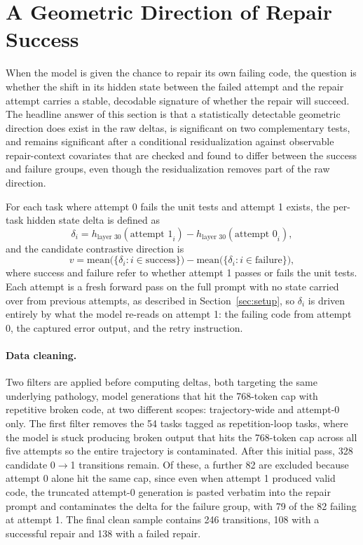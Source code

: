 \section{A Geometric Direction of Repair Success}
\label{sec:repair_geometry}

When the model is given the chance to repair its own failing code, the question is whether the shift in its hidden state between the failed attempt and the repair attempt carries a stable, decodable signature of whether the repair will succeed. The headline answer of this section is that a statistically detectable geometric direction does exist in the raw deltas, is significant on two complementary tests, and remains significant after a conditional residualization against observable repair-context covariates that are checked and found to differ between the success and failure groups, even though the residualization removes part of the raw direction.

For each task where attempt 0 fails the unit tests and attempt 1 exists, the per-task hidden state delta is defined as
\[
    \delta_i = h_{\text{layer 30}}(\text{attempt 1}_i) - h_{\text{layer 30}}(\text{attempt 0}_i),
\]
and the candidate contrastive direction is
\[
    v = \mathrm{mean}\bigl(\{\delta_i : i \in \text{success}\}\bigr) - \mathrm{mean}\bigl(\{\delta_i : i \in \text{failure}\}\bigr),
\]
where success and failure refer to whether attempt 1 passes or fails the unit tests. Each attempt is a fresh forward pass on the full prompt with no state carried over from previous attempts, as described in Section~\ref{sec:setup}, so $\delta_i$ is driven entirely by what the model re-reads on attempt 1: the failing code from attempt 0, the captured error output, and the retry instruction.

\paragraph{Data cleaning.}
Two filters are applied before computing deltas, both targeting the same underlying pathology, model generations that hit the 768-token cap with repetitive broken code, at two different scopes: trajectory-wide and attempt-0 only. The first filter removes the 54 tasks tagged as repetition-loop tasks, where the model is stuck producing broken output that hits the 768-token cap across all five attempts so the entire trajectory is contaminated. After this initial pass, 328 candidate 0$\to$1 transitions remain. Of these, a further 82 are excluded because attempt 0 alone hit the same cap, since even when attempt 1 produced valid code, the truncated attempt-0 generation is pasted verbatim into the repair prompt and contaminates the delta for the failure group, with 79 of the 82 failing at attempt 1. The final clean sample contains 246 transitions, 108 with a successful repair and 138 with a failed repair.

